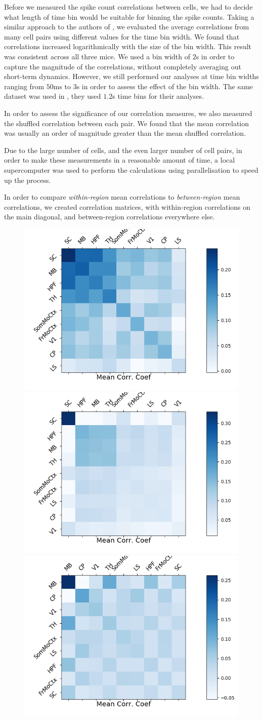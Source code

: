\documentclass[a4paper,12pt]{article}
\theoremstyle{definition}
\begin{document}
Before we measured the spike count correlations between cells, we had to decide what length of time bin would be suitable for binning the spike counts. Taking a similar approach to the authors of \cite{cohen2}, we evaluated the average correlations from many cell pairs using different values for the time bin width. We found that correlations increased logarithmically with the size of the bin width. This result was consistent across all three mice. We used a bin width of $2$s in order to capture the magnitude of the correlations, without completely averaging out short-term dynamics. However, we still performed our analyses at time bin widths ranging from $50$ms to $3$s in order to assess the effect of the bin width. The same dataset was used in \cite{stringer}, they used $1.2$s time bins for their analyses.

In order to assess the significance of our correlation measures, we also measured the shuffled correlation between each pair. We found that the mean correlation was usually an order of magnitude greater than the mean shuffled correlation. 

Due to the large number of cells, and the even larger number of cell pairs, in order to make these measurements in a reasonable amount of time, a local supercomputer was used to perform the calculations using parallelisation to speed up the process.

In order to compare \textit{within-region} mean correlations to \textit{between-region} mean correlations, we created correlation matrices, with within-region correlations on the main diagonal, and between-region correlations everywhere else.

\begin{figure}[t!]
    \centering
    \includegraphics[width=0.32\columnwidth]{images/Krebs_2p0_corr.png}
    \includegraphics[width=0.32\columnwidth]{images/Robbins_2p0_corr.png}
    \includegraphics[width=0.32\columnwidth]{images/Waksman_2p0_corr.png}
    \caption{}
    \label{fig:game_results}
\end{figure}
\end{document}
